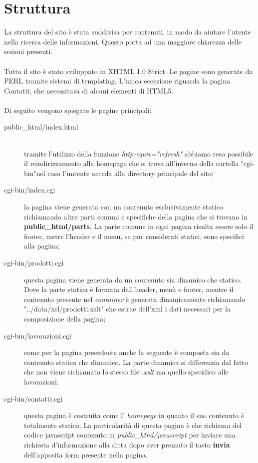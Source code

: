 \documentclass[11pt]{article}
\begin{document}
\section{Struttura}
La struttura del sito è stata suddivisa per contenuti, in modo da aiutare l'utente nella ricerca delle informazioni. Questo porta ad una maggiore chiarezza delle sezioni presenti.
\\
\\
Tutto il sito è stato sviluppato in XHTML 1.0 Strict. Le pagine sono generate da PERL tramite sistemi di templating. L'unica eccezione riguarda la pagina Contatti, che necessitava di alcuni elementi di HTML5.
\\
\\Di seguito vengono spiegate le pagine principali:
\\
\begin{description}
	\item[public\_html/index.html] \hfill \\
	 tramite l'utilizzo della funzione \textit{http-equiv="refresh"} abbiamo reso possibile il reindirizzamento alla homepage che si trova all’interno della cartella "cgi-bin"nel caso l'untente acceda alla directory principale del sito;
	 \item[cgi-bin/index.cgi]  la pagina viene generata con un contenuto esclusivamente statico richiamando altre parti comuni e specifiche della pagina che si trovano in \textbf{public\_html/parts}. La parte comune in ogni pagina risulta essere solo il footer, metre l'header e il menu, se pur considerati statici, sono specifici alla pagina;
	 \item[cgi-bin/prodotti.cgi]  questa pagina viene generata da un contenuto sia dinamico che statico. Dove la parte statica è formata dall'header, menù e footer, mentre il contenuto presente nel \textit{container} è generata dinamicamente richiamando "../data/xsl/prodotti.xslt" che estrae dell'xml i dati necessari per la composizione della pagina;
	 \item[cgi-bin/lavorazioni.cgi]  come per la pagina precedente anche la seguente è composta sia da contenuto statico che dinamico. La parte dinamica si differenzia dal fatto che non viene richiamato lo stesso file \textit{.xslt} ma quello specidico alle lavorazioni. 
	 \item[cgi-bin/contatti.cgi] questa pagina è costruita come l' \textit{homepage} in quanto il suo contenuto è totalmente statico. La particolarità di questa pagina è che richiama del codice javascript contenuto in \textit{public\_html/javascript} per inviare una richiesta d'informazione alla ditta dopo aver premuto il tasto \textbf{invia} dell'apposita form presente nella pagina.

\end{description}
\end{document}

